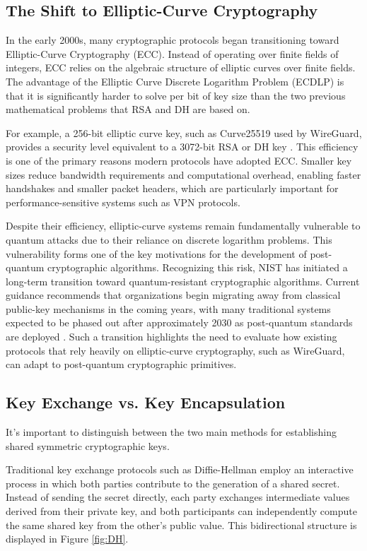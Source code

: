 \subsection{The Shift to Elliptic-Curve Cryptography}
In the early 2000s, many cryptographic protocols began transitioning toward Elliptic-Curve Cryptography (ECC). Instead of operating over finite fields of integers, ECC relies on the algebraic structure of elliptic curves over finite fields. The advantage of the Elliptic Curve Discrete Logarithm Problem (ECDLP) is that it is significantly harder to solve per bit of key size than the two previous mathematical problems that RSA and DH are based on.

For example, a 256-bit elliptic curve key, such as Curve25519 used by WireGuard, provides a security level equivalent to a 3072-bit RSA or DH key \cite{Barker}. This efficiency is one of the primary reasons modern protocols have adopted ECC. Smaller key sizes reduce bandwidth requirements and computational overhead, enabling faster handshakes and smaller packet headers, which are particularly important for performance-sensitive systems such as VPN protocols.

Despite their efficiency, elliptic-curve systems remain fundamentally vulnerable to quantum attacks due to their reliance on discrete logarithm problems. This vulnerability forms one of the key motivations for the development of post-quantum cryptographic algorithms. Recognizing this risk, NIST has initiated a long-term transition toward quantum-resistant cryptographic algorithms. Current guidance recommends that organizations begin migrating away from classical public-key mechanisms in the coming years, with many traditional systems expected to be phased out after approximately 2030 as post-quantum standards are deployed \cite{PQCTransition}. Such a transition highlights the need to evaluate how existing protocols that rely heavily on elliptic-curve cryptography, such as WireGuard, can adapt to post-quantum cryptographic primitives.

\subsection{Key Exchange vs. Key Encapsulation}
It's important to distinguish between the two main methods for establishing shared symmetric cryptographic keys. 

Traditional key exchange protocols such as Diffie-Hellman employ an interactive process in which both parties contribute to the generation of a shared secret. Instead of sending the secret directly, each party exchanges intermediate values derived from their private key, and both participants can independently compute the same shared key from the other's public value. This bidirectional structure is displayed in Figure \ref{fig:DH}.

